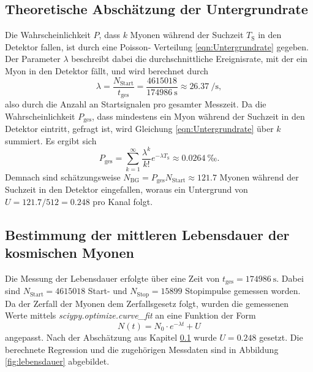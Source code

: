 \subsection{Theoretische Abschätzung der Untergrundrate}
\label{sec:untergrund}
Die Wahrscheinlichkeit $P$, dass $k$ Myonen während der Suchzeit $T_\text{S}$ in den Detektor fallen, ist durch eine Poisson- Verteilung \ref{eqn:Untergrundrate}
gegeben. Der Parameter $\lambda$ beschreibt dabei die durchschnittliche Ereignisrate, mit der ein Myon in den Detektor fällt, und wird berechnet durch
\begin{equation*}
  \lambda=\frac{N_\text{Start}}{t_\text{ges}}=\frac{\num{4615018}}{\SI{174986}{\second}}\approx \SI{26.37}{\per\second},
\end{equation*}
also durch die Anzahl an Startsignalen pro gesamter Messzeit. Da die Wahrscheinlichkeit $P_\text{ges}$, dass mindestens ein Myon während der Suchzeit in den Detektor eintritt,
gefragt ist, wird Gleichung \ref{eqn:Untergrundrate} über $k$ summiert. Es ergibt sich
\begin{equation*}
  P_{\text{ges}}=\sum_{k=1}^\infty\frac{\lambda^k}{k!}e^{-\lambda T_\text{S}}\approx\SI{0.0264}{‰}.
\end{equation*}
Demnach sind schätzungsweise $N_{\text{BG}}=P_{\text{ges}}N_{\text{Start}}\approx\num{121.7}$ Myonen während der Suchzeit in den Detektor eingefallen, woraus ein Untergrund
von $U=\num{121.7}/\num{512}=\num{0.248}$ pro Kanal folgt.

\subsection{Bestimmung der mittleren Lebensdauer der kosmischen Myonen}
\label{sec:lebensdauer}
Die Messung der Lebensdauer erfolgte über eine Zeit von $t_\text{ges}=\SI{174986}{\second}$. Dabei sind $N_\text{Start}=\num{4615018}$ Start- und  $N_\text{Stop}=\num{15899}$
Stopimpulse gemessen worden. 
\noindent
Da der Zerfall der Myonen dem Zerfallsgesetz folgt, wurden die gemessenen Werte mittels \textit{sciypy.optimize.curve\_fit} an eine Funktion der Form 
\begin{equation}
  N(t)=N_0\cdot e^{-\lambda t}+U \label{eqn:expo}
\end{equation}
angepasst. Nach der Abschätzung aus Kapitel \ref{sec:untergrund} wurde $U=0.248$ gesetzt. Die berechnete Regression und die zugehörigen Messdaten sind in Abbildung 
\ref{fig:lebensdauer} abgebildet.

